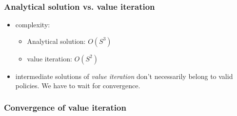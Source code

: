 \begin{frame}\frametitle{Analytical solution vs. value iteration}


\begin{itemize}
\item complexity: 
\begin{itemize}
\item Analytical solution: $O(S^{3})$
\item value iteration: $O(S^{2})$
\end{itemize}   
\item intermediate solutions of \emph{value iteration} don't necessarily belong to valid policies. We have to wait for convergence.
\end{itemize}

\end{frame}

\subsubsection{Convergence of value iteration}


